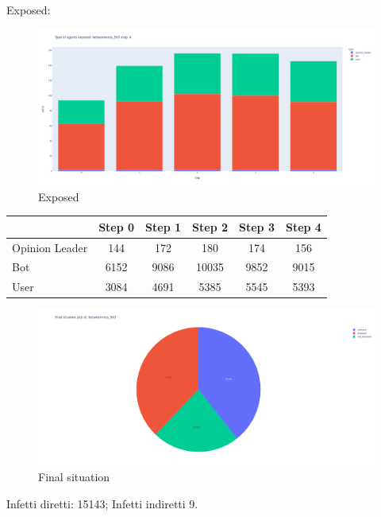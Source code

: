             Exposed:
            \begin{figure}[H]
                \includegraphics[width=16cm]{resources/charts/btw_500_bar.png}
                \caption{Exposed}
                \label{fig:btw_500_bar}
            \end{figure}
            \begin{table}[H]
                \centering
                \begin{tabular}{|l|c|c|c|c|c|}
                \hline
                               & Step 0 & Step 1 & Step 2 & Step 3 & Step 4 \\ \hline
                Opinion Leader & 144    & 172    & 180    & 174    & 156    \\ \hline
                Bot            & 6152   & 9086   & 10035  & 9852   & 9015   \\ \hline
                User           & 3084   & 4691   & 5385   & 5545   & 5393   \\ \hline
                \end{tabular}
            \end{table}
            
            \begin{figure}[H]
                \includegraphics[width=16cm]{resources/charts/btw_500_pie.png}
                \caption{Final situation}
                \label{fig:btw_500_pie}
            \end{figure}
            Infetti diretti: 15143; \newline
            Infetti indiretti 9.
            
